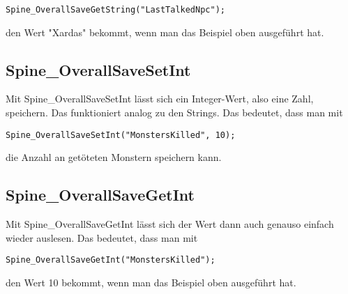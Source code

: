 \documentclass{article}
\begin{document}
\begin{lstlisting}
Spine_OverallSaveGetString("LastTalkedNpc");
\end{lstlisting}

den Wert "Xardas" bekommt, wenn man das Beispiel oben ausgeführt hat.

\subsection{Spine\_OverallSaveSetInt}

Mit Spine\_OverallSaveSetInt lässt sich ein Integer-Wert, also eine Zahl, speichern. Das funktioniert analog zu den Strings. Das bedeutet, dass man mit

\begin{lstlisting}
Spine_OverallSaveSetInt("MonstersKilled", 10);
\end{lstlisting}

die Anzahl an getöteten Monstern speichern kann.

\subsection{Spine\_OverallSaveGetInt}

Mit Spine\_OverallSaveGetInt lässt sich der Wert dann auch genauso einfach wieder auslesen. Das bedeutet, dass man mit

\begin{lstlisting}
Spine_OverallSaveGetInt("MonstersKilled");
\end{lstlisting}

den Wert 10 bekommt, wenn man das Beispiel oben ausgeführt hat.
\end{document}
